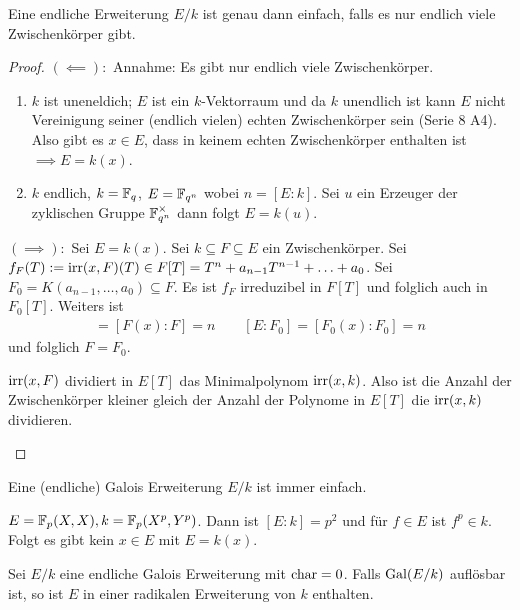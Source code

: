 \begin{proposition}
	Eine endliche Erweiterung $E / k$ ist genau dann einfach, falls es nur endlich viele Zwischenkörper gibt.
\end{proposition}

\begin{proof}
	$(\impliedby):$ Annahme: Es gibt nur endlich viele Zwischenkörper.
	\begin{enumerate}[{Fall} 1:]
		\item $k$ ist uneneldich; $E$ ist ein $k$-Vektorraum und da $k$ unendlich ist kann $E$ nicht Vereinigung seiner (endlich vielen)
			echten Zwischenkörper sein (Serie 8 A4). Also gibt es $x \in E$, dass in keinem echten Zwischenkörper enthalten ist $\implies E = k(x)$.
		\item $k$ endlich, $k = \mathbb{F}_{q}$, $E = \mathbb{F}_{q^{n}}$ wobei $n = [E : k]$.
			Sei $u$ ein Erzeuger der zyklischen Gruppe $\mathbb{F}_{q^{n}}^{\times}$ dann folgt $E = k(u)$.
	\end{enumerate}

	$(\implies):$ Sei $E = k(x)$. Sei $k \subseteq F \subseteq E$ ein Zwischenkörper.
	Sei $f_{F}(T) := \operatorname{irr}(x,F)(T) \in F[T] = T^{n} + a_{n-1} T^{n-1} + \ldots + a_0$.
	Sei $F_{0} = K(a_{n-1},\ldots,a_0) \subseteq F$.
	Es ist $f_{F}$ irreduzibel in $F[T]$ und folglich auch in $F_0[T]$. Weiters ist
	\begin{align*}
		[E:F] = [F(x):F] = n \qquad [E:F_0] = [F_0(x):F_0] = n
	\end{align*}
	und folglich $F = F_0$.
	\begin{remark}
		$\operatorname{irr}(x,F)$ dividiert in $E[T]$ das Minimalpolynom $\operatorname{irr}(x,k)$. Also ist die Anzahl der Zwischenkörper kleiner gleich der Anzahl der
		Polynome in $E[T]$ die $\operatorname{irr}(x,k)$ dividieren.
	\end{remark}
\end{proof}

\begin{corollary}
	Eine (endliche) Galois Erweiterung $E / k$ ist immer einfach.
\end{corollary}

\begin{eg}
	$E = \mathbb{F}_{p}(X,X), k = \mathbb{F}_{p}(X^{p},Y^{p})$.
	Dann ist $[E : k] = p^2$ und für $f \in E$ ist $f^{p} \in k$. Folgt es gibt kein $x \in E$ mit $E = k(x)$.
\end{eg}

\begin{theorem}
	Sei $E / k$ eine endliche Galois Erweiterung mit $\operatorname{char} = 0$. Falls $\operatorname{Gal}(E / k)$ auflösbar ist, so ist $E$ in einer radikalen Erweiterung von $k$ enthalten.
\end{theorem}

